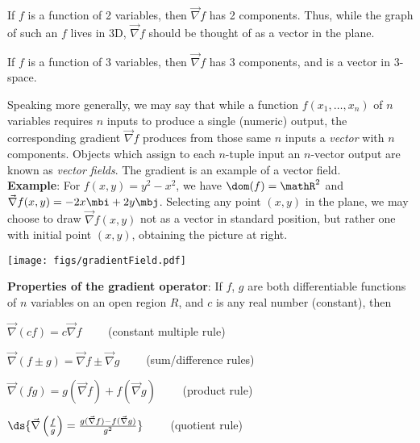 \documentclass[12pt,fleqn]{article}
\def\eg#1{{\bf Example}: #1}
\begin{document}
\item
  If $f$ is a function of 2 variables, then $\vec\nabla f$ has
  2 components.  Thus, while the graph of such an $f$ lives in
  3D, $\vec\nabla f$ should be thought of as a vector in
  the plane.

  If $f$ is a function of 3 variables, then $\vec\nabla f$ has
  3 components, and is a vector in 3-space.

  \newpage
  \begin{minipage}[t]{3.3in}
	Speaking more generally, we may say that while a function
	$f(x_1, \ldots, x_n)$ of $n$ variables requires $n$ inputs
	to produce a single (numeric) output, the corresponding
	gradient $\vec\nabla f$ produces from those same $n$ inputs
	a {\em vector} with $n$ components.  Objects which assign
	to each $n$-tuple input an $n$-vector output are known as
	{\em vector fields}.  The gradient is an example of a vector
	field.\\[14pt]
	\eg{}
	For $f(x,y) = y^2 - x^2$, we have $\dom(f) = \mathR^2$ and
	$\vec\nabla f(x,y) = -2x\mbi + 2y\mbj$.  Selecting any point
	$(x,y)$ in the plane, we may choose to draw $\vec\nabla f(x,y)$
	not as a vector in standard position, but rather one with
	initial point $(x,y)$, obtaining the picture at right.
  \end{minipage}\hspace{0.3in}
  \begin{minipage}[t]{3.2in}
	\mbox{}

	\vspace{-0.3in}
	\texttt{[image: figs/gradientField.pdf]}
  \end{minipage}

\item
  {\bf Properties of the gradient operator}:
  If $f$, $g$ are both differentiable functions of $n$ variables
  on an open region $R$, and $c$ is any real number (constant), then
  \be
  \item
	$\vec\nabla(cf) = c\vec\nabla f \qquad$ (constant multiple rule)\\
  \item
	$\vec\nabla(f \pm g) = \vec\nabla f \pm \vec\nabla g \qquad$
	(sum/difference rules)\\
  \item
	$\vec\nabla(f g) = g(\vec\nabla f) + f(\vec\nabla g) \qquad$
	(product rule)\\
  \item
	$\ds{\vec\nabla\left(\frac{f}{g}\right)
	  = \frac{g(\vec\nabla f) - f(\vec\nabla g)}{g^2}} \qquad$
	(quotient rule)
  \ee
\ei
\end{document}
